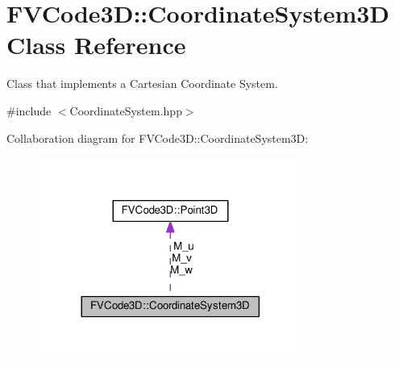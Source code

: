 \hypertarget{classFVCode3D_1_1CoordinateSystem3D}{}\section{F\+V\+Code3D\+:\+:Coordinate\+System3D Class Reference}
\label{classFVCode3D_1_1CoordinateSystem3D}


Class that implements a Cartesian Coordinate System.  




{\ttfamily \#include $<$Coordinate\+System.\+hpp$>$}



Collaboration diagram for F\+V\+Code3D\+:\+:Coordinate\+System3D\+:
\nopagebreak
\begin{figure}[H]
\begin{center}
\leavevmode
\includegraphics[width=245pt]{classFVCode3D_1_1CoordinateSystem3D__coll__graph}
\end{center}
\end{figure}
